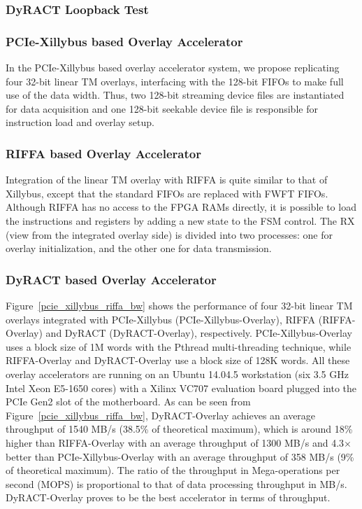 \subsubsection{DyRACT Loopback Test}

\subsubsection{PCIe-Xillybus based Overlay Accelerator}
In the PCIe-Xillybus based overlay accelerator system, we propose replicating four 32-bit linear TM overlays, interfacing with the 128-bit FIFOs to make full use of the data width.
Thus, two 128-bit streaming device files are instantiated for data acquisition and one 128-bit seekable device file is responsible for instruction load and overlay setup. 

\subsubsection{RIFFA based Overlay Accelerator}
Integration of the linear TM overlay with RIFFA is quite similar to that of Xillybus, except that the standard FIFOs are replaced with FWFT FIFOs.  
Although RIFFA has no access to the FPGA RAMs directly, it is possible to load the instructions and registers by adding a new state to the FSM control. 
The RX (view from the integrated overlay side) is divided into two processes: one for overlay initialization, and the other one for data transmission. 

\subsubsection{DyRACT based Overlay Accelerator}


Figure~\ref{pcie_xillybus_riffa_bw} shows the performance of four 32-bit linear TM overlays integrated with PCIe-Xillybus (PCIe-Xillybus-Overlay), RIFFA (RIFFA-Overlay) and DyRACT (DyRACT-Overlay), respectively. 
PCIe-Xillybus-Overlay uses a block size of 1M words with the Pthread multi-threading technique, while RIFFA-Overlay and DyRACT-Overlay use a block size of 128K words.
All these overlay accelerators are running on an Ubuntu 14.04.5 workstation (six 3.5 GHz Intel Xeon E5-1650 cores) with a Xilinx VC707 evaluation board plugged into the PCIe Gen2 slot of the motherboard. 
As can be seen from Figure~\ref{pcie_xillybus_riffa_bw}, DyRACT-Overlay achieves an average throughput of 1540 MB/s (38.5\% of theoretical maximum), which is around 18\% higher than RIFFA-Overlay with an average throughput of 1300 MB/s and 4.3$\times$ better than PCIe-Xillybus-Overlay with an average throughput of 358 MB/s (9\% of theoretical maximum). 
The ratio of the throughput in Mega-operations per second (MOPS) is proportional to that of data processing throughput in MB/s. 
DyRACT-Overlay proves to be the best accelerator in terms of throughput. 

